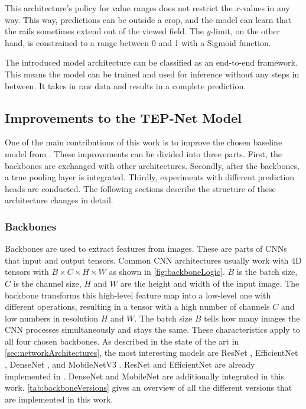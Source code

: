 This architecture's policy for value ranges does not restrict the $x$-values in any way.
This way, predictions can be outside a crop, and the model can learn that the rails sometimes extend out of the viewed field.
The $y$-limit, on the other hand, is constrained to a range between 0 and 1 with a Sigmoid function.

The introduced model architecture can be classified as an end-to-end framework.
This means the model can be trained and used for inference without any steps in between.
It takes in raw data and results in a complete prediction.


\subsection{Improvements to the TEP-Net Model}
\label{subsec:improvemensts2BaselineModel}

One of the main contributions of this work is to improve the chosen baseline model from \cite{tepNet2024}.
These improvements can be divided into three parts.
First, the backbones are exchanged with other architectures.
Secondly, after the backbones, a true pooling layer is integrated.
Thirdly, experiments with different prediction heads are conducted.
The following sections describe the structure of these architecture changes in detail.

\subsubsection{Backbones}
\label{subsubsec:backbones}

Backbones are used to extract features from images.
These are parts of \ac{CNN}s that input and output tensors.
Common \ac{CNN} architectures usually work with 4D tensors with $B \times C \times H \times W$ as shown in \autoref{fig:backboneLogic}.
$B$ is the batch size, $C$ is the channel size, $H$ and $W$ are the height and width of the input image.
The backbone transforms this high-level feature map into a low-level one with different operations, resulting in a tensor with a high number of channels $C$ and low numbers in resolution $H$ and $W$.
The batch size $B$ tells how many images the \ac{CNN} processes simultaneously and stays the same.
These characteristics apply to all four chosen backbones.
As described in the state of the art in \autoref{sec:networkArchitectures}, the most interesting models are ResNet \cite{ResNet}, EfficientNet \cite{EfficientNet}, DenseNet \cite{DenseNets}, and MobileNetV3 \cite{MobileNetV3}.
ResNet and EfficientNet are already implemented in \cite{tepNet2024}.
DenseNet and MobileNet are additionally integrated in this work.
\autoref{tab:backboneVersions} gives an overview of all the different versions that are implemented in this work.

